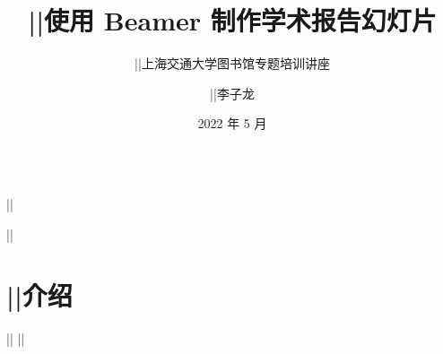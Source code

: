 \begin{frame}[fragile]
\begin{columns}
\begin{column}{0.6\textwidth}
\begin{codeblock}[]{}
  \title{||使用 Beamer 制作学术报告幻灯片}
  \subtitle{||上海交通大学图书馆专题培训讲座}
  \author{||李子龙}
  \date{2022 年 5 月}
||  \maketitle
||  \part{||介绍}
||  \makebottom
||
      \end{codeblock}
    \end{column}
    \begin{column}{0.4\textwidth}
\end{column}
\end{columns}
\end{frame}
